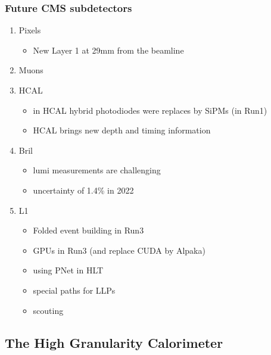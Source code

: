 \documentclass[11pt]{article}
\begin{document}
\subsubsection{Future CMS subdetectors}
\label{sec:orgfe967d5}
\label{sec:hllhc_future_subdetectors.org}
\begin{enumerate}
\item Pixels
\label{sec:org28e5667}
\begin{itemize}
\item New Layer 1 at 29mm from the beamline
\end{itemize}
\item Muons
\label{sec:orgee3d6ca}
\item HCAL
\label{sec:org93875e0}
\begin{itemize}
\item in HCAL hybrid photodiodes were replaces by SiPMs (in Run1)
\item HCAL brings new depth and timing information
\end{itemize}
\item Bril
\label{sec:org5735f9b}
\begin{itemize}
\item lumi measurements are challenging
\item uncertainty of 1.4\% in 2022
\end{itemize}
\item L1
\label{sec:orgc074e6a}
\begin{itemize}
\item Folded event building in Run3
\item GPUs in Run3 (and replace CUDA by Alpaka)
\item using PNet in HLT
\item special paths for LLPs
\item scouting
\end{itemize}
\end{enumerate}
\subsection{The High Granularity Calorimeter}
\label{sec:org1b36e0e}
\label{sec:hgcal_intro}
\end{document}

